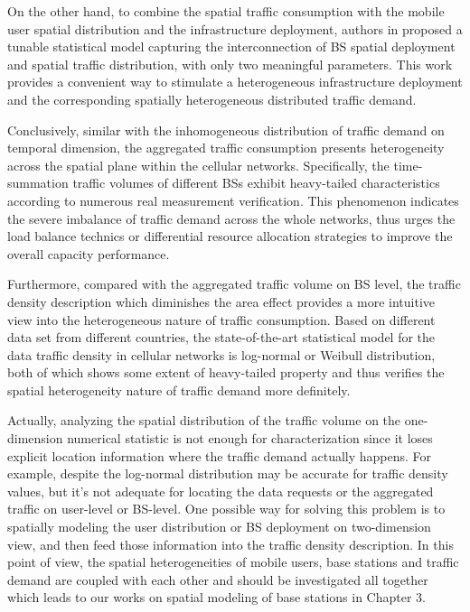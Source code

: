 On the other hand, to combine the spatial traffic consumption with the mobile user spatial distribution and the infrastructure deployment, authors in \cite{mirahsan2015hethetnets} proposed a tunable statistical model capturing the interconnection of BS spatial deployment and spatial traffic distribution, with only two meaningful parameters. This work provides a convenient way to stimulate a heterogeneous infrastructure deployment and the corresponding spatially heterogeneous distributed traffic demand.

Conclusively, similar with the inhomogeneous distribution of traffic demand on temporal dimension, the aggregated traffic consumption presents heterogeneity across the spatial plane within the cellular networks. Specifically, the time-summation traffic volumes of different BSs exhibit heavy-tailed characteristics according to numerous real measurement verification. This phenomenon indicates the severe imbalance of traffic demand across the whole networks, thus urges the load balance technics or differential resource allocation strategies to improve the overall capacity performance.

Furthermore, compared with the aggregated traffic volume on BS level, the traffic density description which diminishes the area effect provides a more intuitive view into the heterogeneous nature of traffic consumption. Based on different data set from different countries, the state-of-the-art statistical model for the data traffic density in cellular networks is log-normal or Weibull distribution, both of which shows some extent of heavy-tailed property and thus verifies the spatial heterogeneity nature of traffic demand more definitely.

Actually, analyzing the spatial distribution of the traffic volume on the one-dimension numerical statistic is not enough for characterization since it loses explicit location information where the traffic demand actually happens. For example, despite the log-normal distribution may be accurate for traffic density values, but it's not adequate for locating the data requests or the aggregated traffic on user-level or BS-level. One possible way for solving this problem is to spatially modeling the user distribution or BS deployment on two-dimension view, and then feed those information into the traffic density description. In this point of view, the spatial heterogeneities of mobile users, base stations and traffic demand are coupled with each other and should be investigated all together which leads to our works on spatial modeling of base stations in Chapter 3.


